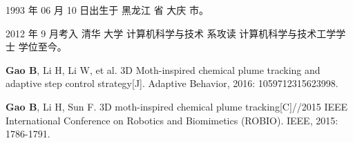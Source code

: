 \begin{resume}


  1993 年 06 月 10 日出生于 黑龙江 省 大庆 市。

  2012 年 9 月考入 清华 大学 计算机科学与技术 系攻读 计算机科学与技术工学学士 学位至今。


  \begin{publications}
    \item \textbf{Gao B}, Li H, Li W, et al. 3D Moth-inspired chemical plume tracking and adaptive step control strategy[J]. Adaptive Behavior, 2016: 1059712315623998.
    \item \textbf{Gao B}, Li H, Sun F. 3D moth-inspired chemical plume tracking[C]//2015 IEEE International Conference on Robotics and Biomimetics (ROBIO). IEEE, 2015: 1786-1791.
  \end{publications}

\end{resume}
